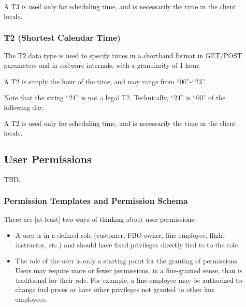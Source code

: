 \documentclass[letterpaper,10pt,titlepage]{article}
\begin{document}
A T3 is used only for scheduling time, and is necessarily the time in the
client locale.


\subsubsection{T2 (Shortest Calendar Time)}
\label{stdd0:sdty0:sdtt2}

%
The T2 data type is used to specify times in a shorthand
format in GET/POST parameters and in software internals, with
a granularity of 1 hour.

A T2 is simply the hour of the time, and may range from ``00''-``23''.

Note that the string ``24'' is not a legal T2\@.  Technically, ``24'' is
``00'' of the following day.

A T2 is used only for scheduling time, and is necessarily the time in the
client locale.


\subsection{User Permissions}
\label{stdd0:supm0}

TBD.


\subsubsection{Permission Templates and Permission Schema}
\label{stdd0:supm0:snap0}

There are [at least] two ways of thinking about user permissions:

\begin{itemize}
\item A user is in a defined role (customer, FBO owner, line employee,
      flight instructor, etc.) and should have fixed privileges
      directly tied to to the role.
\item The role of the user is only a starting point for the granting
      of permissions.  Users may require more or fewer permissions, in
      a fine-grained sense, than is traditional for their role.  For example,
      a line employee may be authorized to change fuel prices or have other
      privileges not granted to other line employees.
\end{itemize}
\end{document}
